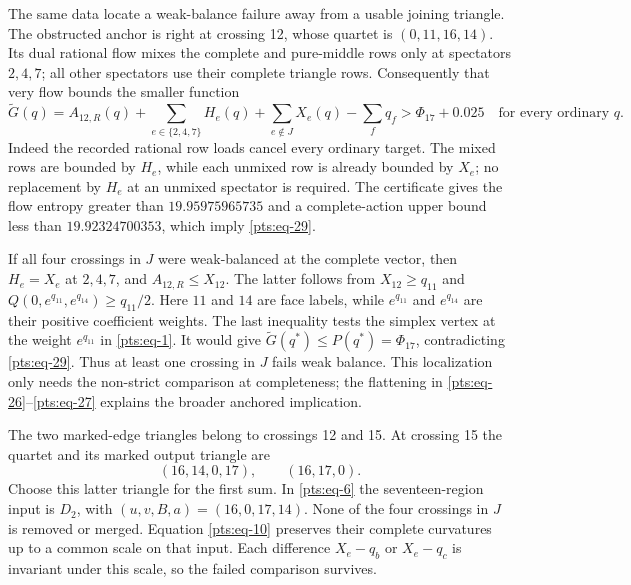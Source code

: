 The same data locate a weak-balance failure away from a usable joining
triangle. The obstructed anchor is right at crossing 12, whose quartet
is \((0,11,16,14)\). Its dual rational flow mixes the complete and
pure-middle rows only at spectators \(2,4,7\); all other spectators use
their complete triangle rows. Consequently that very flow bounds the
smaller function \begin{equation}\label{pts:eq-29}
\widetilde G(q)=A_{12,R}(q)+
      \sum_{e\in\{2,4,7\}}H_e(q)+
      \sum_{e\notin J}X_e(q)-\sum_fq_f
                  >\Phi_{17}+0.025
            \quad\text{for every ordinary }q.
\end{equation} Indeed the recorded rational row loads cancel every ordinary target.
The mixed rows are bounded by \(H_e\), while each unmixed row is already
bounded by \(X_e\); no replacement by \(H_e\) at an unmixed spectator is
required. The certificate gives the flow entropy greater than
\(19.95975965735\) and a complete-action upper bound less than
\(19.92324700353\), which imply \eqref{pts:eq-29}.

If all four crossings in \(J\) were weak-balanced at the complete
vector, then \(H_e=X_e\) at \(2,4,7\), and \(A_{12,R}\le X_{12}\). The
latter follows from \(X_{12}\ge q_{11}\) and
\(Q(0,e^{q_{11}},e^{q_{14}})\ge q_{11}/2\). Here $11$ and $14$
are face labels, while $e^{q_{11}}$ and $e^{q_{14}}$ are their positive
coefficient weights. The last inequality tests the simplex vertex at
the weight $e^{q_{11}}$ in \eqref{pts:eq-1}.
It would give \(\widetilde G(q^*)\le P(q^*)=\Phi_{17}\), contradicting
\eqref{pts:eq-29}. Thus at least one crossing in \(J\) fails weak balance. This
localization only needs the non-strict comparison at completeness; the
flattening in \eqref{pts:eq-26}--\eqref{pts:eq-27} explains the broader anchored implication.

The two marked-edge triangles belong to crossings 12 and 15. At crossing
15 the quartet and its marked output triangle are \begin{equation}\label{pts:eq-30}
(16,14,0,17),\qquad (16,17,0).
\end{equation} Choose this latter triangle for the first sum. In \eqref{pts:eq-6} the
seventeen-region input is \(D_2\), with \((u,v,B,a)=(16,0,17,14)\). None
of the four crossings in \(J\) is removed or merged. Equation \eqref{pts:eq-10}
preserves their complete curvatures up to a common scale on that input.
Each difference \(X_e-q_b\) or \(X_e-q_c\) is invariant under this
scale, so the failed comparison survives.

